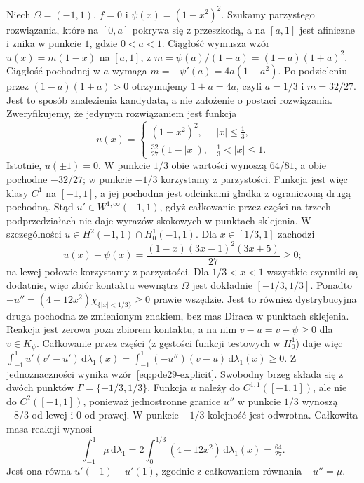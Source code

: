 \begin{przyklad}
\label{ex:pde29-explicit}
Niech $\Omega=(-1,1)$, $f=0$ i
$\psi(x)=(1-x^2)^2$.
Szukamy parzystego rozwiązania, które na $[0,a]$
pokrywa się z przeszkodą, a na $[a,1]$ jest afiniczne
i znika w punkcie $1$, gdzie $0<a<1$.
Ciągłość wymusza wzór $u(x)=m(1-x)$ na $[a,1]$,
z $m=\psi(a)/(1-a)=(1-a)(1+a)^2$.
Ciągłość pochodnej w $a$ wymaga
$m=-\psi'(a)=4a(1-a^2)$.
Po podzieleniu przez $(1-a)(1+a)>0$
otrzymujemy $1+a=4a$, czyli $a=1/3$ i $m=32/27$.
Jest to sposób znalezienia kandydata, a nie
założenie o postaci rozwiązania.
Zweryfikujemy, że jedynym rozwiązaniem jest funkcja
\begin{equation}\label{eq:pde29-explicit}
 u(x)=\begin{cases}
 (1-x^2)^2,& |x|\le\frac13,\\
 \frac{32}{27}(1-|x|),&\frac13<|x|\le1.
 \end{cases}
\end{equation}
Istotnie, $u(\pm1)=0$. W punkcie $1/3$
obie wartości wynoszą $64/81$, a obie pochodne
$-32/27$; w punkcie $-1/3$ korzystamy z parzystości.
Funkcja jest więc klasy $C^1$ na $[-1,1]$,
a jej pochodna jest odcinkami gładka z ograniczoną
drugą pochodną. Stąd $u'\in W^{1,\infty}(-1,1)$,
gdyż całkowanie przez części na trzech podprzedziałach
nie daje wyrazów skokowych w punktach sklejenia.
W szczególności $u\in H^2(-1,1)\cap H_0^1(-1,1)$. Dla $x\in[1/3,1]$ zachodzi
\[
 u(x)-\psi(x)=\frac{(1-x)(3x-1)^2(3x+5)}{27}\ge0;
\]
na lewej połowie korzystamy z parzystości.
Dla $1/3<x<1$ wszystkie czynniki są dodatnie,
więc zbiór kontaktu wewnątrz $\Omega$ jest dokładnie
$[-1/3,1/3]$.
Ponadto $-u''=(4-12x^2)\chi_{\{|x|<1/3\}}\ge0$
prawie wszędzie. Jest to również dystrybucyjna
druga pochodna ze zmienionym znakiem,
bez mas Diraca w punktach sklejenia.
Reakcja jest zerowa poza zbiorem kontaktu,
a na nim $v-u=v-\psi\ge0$ dla $v\in K_\psi$.
Całkowanie przez części (z gęstości funkcji
testowych w $H_0^1$) daje więc
$\int_{-1}^1u'(v'-u')\,\mathrm d\lambda_1(x)
=\int_{-1}^1(-u'')(v-u)\,\mathrm d\lambda_1(x)\ge0$.
Z jednoznaczności wynika wzór~\eqref{eq:pde29-explicit}.
Swobodny brzeg składa się z dwóch punktów
$\Gamma=\{-1/3,1/3\}$. Funkcja $u$ należy do
$C^{1,1}([-1,1])$, ale nie do $C^2([-1,1])$,
ponieważ jednostronne granice $u''$ w punkcie $1/3$
wynoszą $-8/3$ od lewej i $0$ od prawej.
W punkcie $-1/3$ kolejność jest odwrotna.
Całkowita masa reakcji wynosi
\[
 \int_{-1}^1\mu\,\mathrm d\lambda_1
 =2\int_0^{1/3}(4-12x^2)\,\mathrm d\lambda_1(x)
 =\tfrac{64}{27}.
\]
Jest ona równa $u'(-1)-u'(1)$, zgodnie
z całkowaniem równania $-u''=\mu$.
\end{przyklad}

